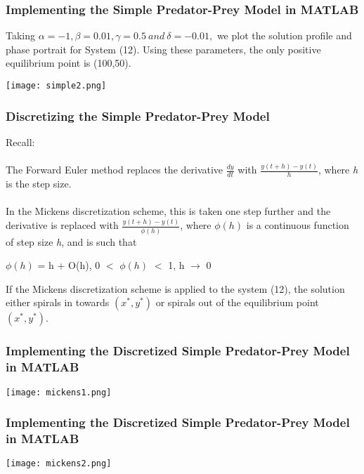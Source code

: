 \documentclass[xcolor={svgnames},hyperref={colorlinks,allcolors=Blue}]{beamer}
\begin{document}
\begin{frame}
\frametitle{Implementing the Simple Predator-Prey Model in MATLAB}

Taking $\alpha = -1, \beta = 0.01, \gamma = 0.5 ~and~ \delta = -0.01,$ we plot the solution profile and phase portrait for System (12). Using these parameters, the only positive equilibrium point is (100,50).

	\begin{center}
	\pause
		\texttt{[image: simple2.png]}
	\end{center}

\end{frame}

\begin{frame}
\frametitle{Discretizing the Simple Predator-Prey Model}
Recall: \\~\\
\pause
The Forward Euler method replaces the derivative $\frac{dy}{dt}$ with $\frac{y(t+h)-y(t)}{h}$, where \textit{h} is the step size. \\~\\ 
\pause
In the Mickens discretization scheme, this is taken one step further and the derivative is replaced with $\frac{y(t+h)-y(t)}{\phi(h)}$, \pause where $\phi(h)$ is a continuous function of step size \textit{h}, and is such that\\ 
\begin{center}
$\phi(h)$ = h + O(h), 0 $<$ $\phi(h)$ $<$ 1, h $\rightarrow$ 0
\end{center}
\pause If the Mickens discretization scheme is applied to the system (12), the solution either spirals in towards $(x^*,y^*)$ or spirals out of the equilibrium point $(x^*,y^*)$. 
\end{frame}

\begin{frame}
\frametitle{Implementing the Discretized Simple Predator-Prey Model in MATLAB}

	\begin{center}
		\texttt{[image: mickens1.png]}
	\end{center}

\end{frame}

\begin{frame}
\frametitle{Implementing the Discretized Simple Predator-Prey Model in MATLAB}

	\begin{center}
		\texttt{[image: mickens2.png]}
	\end{center}

\end{frame}
\end{document}

